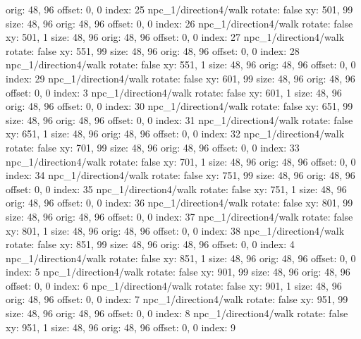   orig: 48, 96
  offset: 0, 0
  index: 25
npc_1/direction4/walk
  rotate: false
  xy: 501, 99
  size: 48, 96
  orig: 48, 96
  offset: 0, 0
  index: 26
npc_1/direction4/walk
  rotate: false
  xy: 501, 1
  size: 48, 96
  orig: 48, 96
  offset: 0, 0
  index: 27
npc_1/direction4/walk
  rotate: false
  xy: 551, 99
  size: 48, 96
  orig: 48, 96
  offset: 0, 0
  index: 28
npc_1/direction4/walk
  rotate: false
  xy: 551, 1
  size: 48, 96
  orig: 48, 96
  offset: 0, 0
  index: 29
npc_1/direction4/walk
  rotate: false
  xy: 601, 99
  size: 48, 96
  orig: 48, 96
  offset: 0, 0
  index: 3
npc_1/direction4/walk
  rotate: false
  xy: 601, 1
  size: 48, 96
  orig: 48, 96
  offset: 0, 0
  index: 30
npc_1/direction4/walk
  rotate: false
  xy: 651, 99
  size: 48, 96
  orig: 48, 96
  offset: 0, 0
  index: 31
npc_1/direction4/walk
  rotate: false
  xy: 651, 1
  size: 48, 96
  orig: 48, 96
  offset: 0, 0
  index: 32
npc_1/direction4/walk
  rotate: false
  xy: 701, 99
  size: 48, 96
  orig: 48, 96
  offset: 0, 0
  index: 33
npc_1/direction4/walk
  rotate: false
  xy: 701, 1
  size: 48, 96
  orig: 48, 96
  offset: 0, 0
  index: 34
npc_1/direction4/walk
  rotate: false
  xy: 751, 99
  size: 48, 96
  orig: 48, 96
  offset: 0, 0
  index: 35
npc_1/direction4/walk
  rotate: false
  xy: 751, 1
  size: 48, 96
  orig: 48, 96
  offset: 0, 0
  index: 36
npc_1/direction4/walk
  rotate: false
  xy: 801, 99
  size: 48, 96
  orig: 48, 96
  offset: 0, 0
  index: 37
npc_1/direction4/walk
  rotate: false
  xy: 801, 1
  size: 48, 96
  orig: 48, 96
  offset: 0, 0
  index: 38
npc_1/direction4/walk
  rotate: false
  xy: 851, 99
  size: 48, 96
  orig: 48, 96
  offset: 0, 0
  index: 4
npc_1/direction4/walk
  rotate: false
  xy: 851, 1
  size: 48, 96
  orig: 48, 96
  offset: 0, 0
  index: 5
npc_1/direction4/walk
  rotate: false
  xy: 901, 99
  size: 48, 96
  orig: 48, 96
  offset: 0, 0
  index: 6
npc_1/direction4/walk
  rotate: false
  xy: 901, 1
  size: 48, 96
  orig: 48, 96
  offset: 0, 0
  index: 7
npc_1/direction4/walk
  rotate: false
  xy: 951, 99
  size: 48, 96
  orig: 48, 96
  offset: 0, 0
  index: 8
npc_1/direction4/walk
  rotate: false
  xy: 951, 1
  size: 48, 96
  orig: 48, 96
  offset: 0, 0
  index: 9

